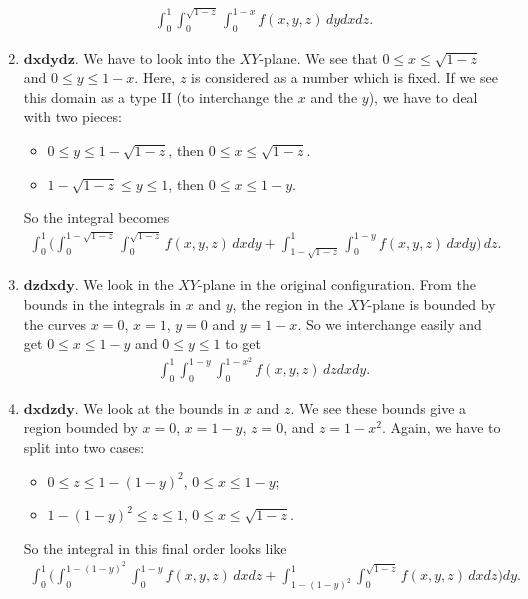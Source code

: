 \begin{enumerate}
\begin{align*}
		\int_0^1 \int_0^{\sqrt{1- z}} \int_0^{1-x} f(x, y ,z) \, dy dx dz .
		\end{align*}
	\item $\mathbf{dxdydz}$. We have to look into the $XY$-plane. We see that $0 \leq x \leq \sqrt{1 - z}$ and $0 \leq y \leq 1 - x$. Here, $z$ is considered as a number which is fixed. If we see this domain as a type II (to interchange the $x$ and the $y$), we have to deal with two pieces:
		\begin{itemize}
		\item $0 \leq y \leq 1 - \sqrt{1-z}$, then $0 \leq x \leq \sqrt{1 - z}$.
		\item $1 - \sqrt{1 - z} \leq y \leq 1$, then $0 \leq x \leq 1 - y$.
		\end{itemize}
	So the integral becomes
		\begin{align*}
		\int_0^1 \Big( \int_0^{1-\sqrt{1-z}} \int_0^{\sqrt{1 - z}} f(x, y, z) \, dx dy + \int_{1 - \sqrt{1-z}}^1 \int_0^{1-y} f(x, y, z) \, dx dy \Big) \, dz .
		\end{align*}
	\item $\mathbf{dz dx dy}$. We look in the $XY$-plane in the original configuration. From the bounds in the integrals in $x$ and $y$, the region in the $XY$-plane is bounded by the curves $x = 0$, $x = 1$, $y = 0$ and $y = 1-x$. So we interchange easily and get $0 \leq x \leq 1 - y$ and $0 \leq y \leq 1$ to get
		\begin{align*}
		\int_0^1 \int_0^{1-y} \int_0^{1-x^2} f(x, y, z) \, dz dx dy .
		\end{align*}
	\item $\mathbf{dx dz dy}$. We look at the bounds in $x$ and $z$. We see these bounds give a region bounded by $x = 0$, $x = 1-y$, $z = 0$, and $z = 1-x^2$. Again, we have to split into two cases:
		\begin{itemize}
		\item $0 \leq z \leq 1 - (1-y)^2$, $0 \leq x \leq 1 - y$;
		\item $1 - (1 -y)^2 \leq z \leq 1$, $0 \leq x \leq \sqrt{1 - z}$.
		\end{itemize}
	So the integral in this final order looks like
		\begin{align*}
		\int_0^1 \Big( \int_0^{1 - (1-y)^2} \int_0^{1 - y} f(x, y, z) \, dx dz + \int_{1- (1-y)^2}^1 \int_0^{\sqrt{1 - z}} f(x, y, z) \, dx dz \Big) dy .
		\end{align*}
	\end{enumerate}

